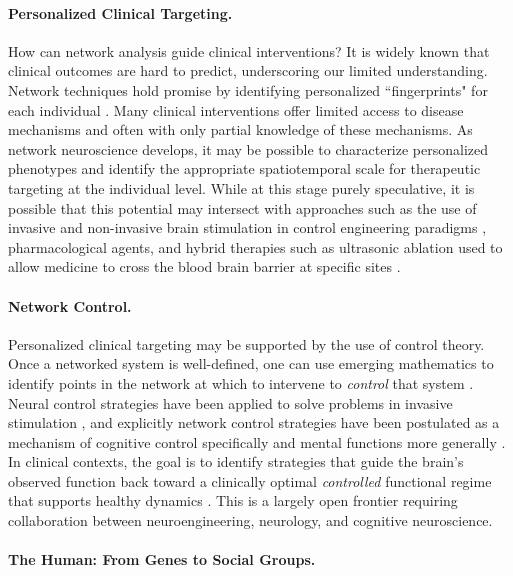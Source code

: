 \documentclass[12pt]{article}
\begin{document}
\paragraph{Personalized Clinical Targeting.}

How can network analysis guide clinical interventions? It is widely known that clinical outcomes are hard to predict, underscoring our limited understanding. Network techniques hold promise by identifying personalized ``fingerprints" for each individual \cite{finn2015functional}. Many clinical interventions offer limited access to disease mechanisms and often with only partial knowledge of these mechanisms. As network neuroscience develops, it may be possible to characterize personalized phenotypes and identify the appropriate spatiotemporal scale for therapeutic targeting at the individual level. While at this stage purely speculative, it is possible that this potential may intersect with approaches such as the use of invasive and non-invasive brain stimulation in control engineering paradigms \cite{medaglia2016mind}, pharmacological agents, and hybrid therapies such as ultrasonic ablation used to allow medicine to cross the blood brain barrier at specific sites \cite{mcdannold2006targeted}. 

\paragraph{Network Control.}

Personalized clinical targeting may be supported by the use of control theory. Once a networked system is well-defined, one can use emerging mathematics to identify points in the network at which to intervene to \emph{control} that system \cite{Ruths2014,liu2011controllability}. Neural control strategies have been applied to solve problems in invasive stimulation \cite{Schiff2012}, and explicitly network control strategies \cite{betzel2016optimally} have been postulated as a mechanism of cognitive control specifically \cite{Gu2015} and mental functions more generally \cite{medaglia2016mind}. In clinical contexts, the goal is to identify strategies that guide the brain's observed function back toward a clinically optimal \emph{controlled} functional regime that supports healthy dynamics \cite{Schiff2012,medaglia2016mind}. This is a largely open frontier requiring collaboration between neuroengineering, neurology, and cognitive neuroscience.

\paragraph{The Human: From Genes to Social Groups.}
\end{document}
